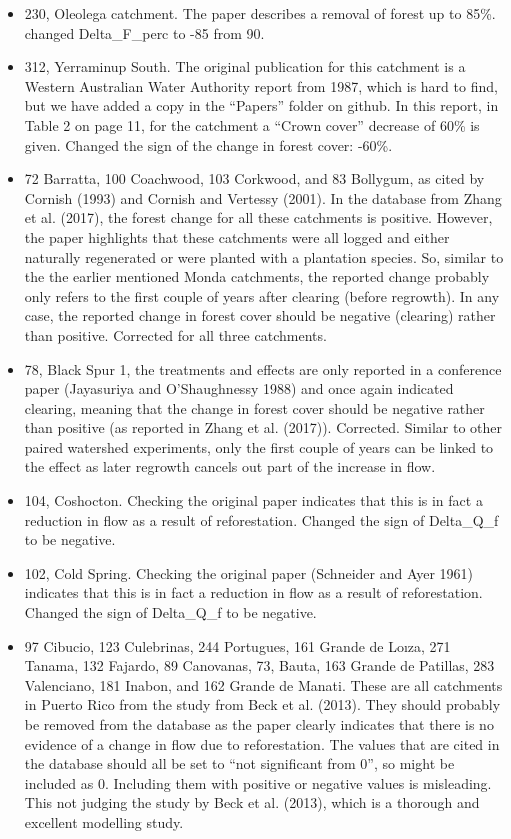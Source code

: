 \documentclass[]{elsarticle} %
\begin{document}
\begin{itemize}
\item
  230, Oleolega catchment. The paper describes a removal of forest up to 85\%. changed Delta\_F\_perc to -85 from 90.\\
\item
  312, Yerraminup South. The original publication for this catchment is a Western Australian Water Authority report from 1987, which is hard to find, but we have added a copy in the ``Papers'' folder on github. In this report, in Table 2 on page 11, for the catchment a ``Crown cover'' decrease of 60\% is given. Changed the sign of the change in forest cover: -60\%.\\
\item
  72 Barratta, 100 Coachwood, 103 Corkwood, and 83 Bollygum, as cited by Cornish (1993) and Cornish and Vertessy (2001). In the database from Zhang et al. (2017), the forest change for all these catchments is positive. However, the paper highlights that these catchments were all logged and either naturally regenerated or were planted with a plantation species. So, similar to the the earlier mentioned Monda catchments, the reported change probably only refers to the first couple of years after clearing (before regrowth). In any case, the reported change in forest cover should be negative (clearing) rather than positive. Corrected for all three catchments.\\
\item
  78, Black Spur 1, the treatments and effects are only reported in a conference paper (Jayasuriya and O'Shaughnessy 1988) and once again indicated clearing, meaning that the change in forest cover should be negative rather than positive (as reported in Zhang et al. (2017)). Corrected. Similar to other paired watershed experiments, only the first couple of years can be linked to the effect as later regrowth cancels out part of the increase in flow.\\
\item
  104, Coshocton. Checking the original paper indicates that this is in fact a reduction in flow as a result of reforestation. Changed the sign of Delta\_Q\_f to be negative.\\
\item
  102, Cold Spring. Checking the original paper (Schneider and Ayer 1961) indicates that this is in fact a reduction in flow as a result of reforestation. Changed the sign of Delta\_Q\_f to be negative.\\
\item
  97 Cibucio, 123 Culebrinas, 244 Portugues, 161 Grande de Loıza, 271 Tanama, 132 Fajardo, 89 Canovanas, 73, Bauta, 163 Grande de Patillas, 283 Valenciano, 181 Inabon, and 162 Grande de Manati. These are all catchments in Puerto Rico from the study from Beck et al. (2013). They should probably be removed from the database as the paper clearly indicates that there is no evidence of a change in flow due to reforestation. The values that are cited in the database should all be set to ``not significant from 0'', so might be included as 0. Including them with positive or negative values is misleading. This not judging the study by Beck et al. (2013), which is a thorough and excellent modelling study.\\

\end{itemize}
\end{document}
